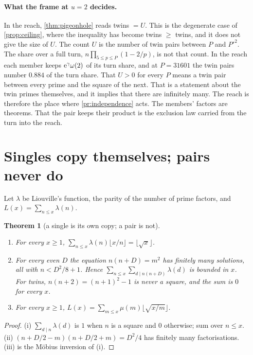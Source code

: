 \documentclass[11pt]{article}
\newtheorem{theorem}{Theorem}[section]
\theoremstyle{definition}\newtheorem{definition}[theorem]{Definition}
\theoremstyle{remark}\newtheorem{remark}[theorem]{Remark}
\begin{document}
\paragraph{What the frame at $u=2$ decides.} In the reach, \cref{thm:pigeonhole} reads twins $=U$. This is the degenerate case of \cref{prop:ceiling}, where the inequality has become twins $\ge$ twins, and it does not give the size of $U$. The count $U$ is the number of twin pairs between $P$ and $P'^2$. The share over a full turn, $n\prod_{5\le p\le P}(1-2/p)$, is not that count. In the reach each member keeps $\mathrm e^\gamma\omega(2)$ of its turn share, and at $P=31601$ the twin pairs number $0.884$ of the turn share. That $U>0$ for every $P$ means a twin pair between every prime and the square of the next. That is a statement about the twin primes themselves, and it implies that there are infinitely many. The reach is therefore the place where \cref{pr:independence} acts. The members' factors are theorems. That the pair keeps their product is the exclusion law carried from the turn into the reach.

\section{Singles copy themselves; pairs never do}\label{sec:self-copy}

Let $\lambda$ be Liouville's function, the parity of the number of prime factors, and $L(x)=\sum_{n\le x}\lambda(n)$.

\begin{theorem}[a single is its own copy; a pair is not]\label{thm:copy}
\begin{enumerate}[label=\textup{(\roman*)}]
\item For every $x\ge1$, $\sum_{n\le x}\lambda(n)\lfloor x/n\rfloor=\lfloor\sqrt x\rfloor$.
\item For every even $D$ the equation $n(n+D)=m^2$ has finitely many solutions, all with $n<D^2/8+1$. Hence $\sum_{n\le x}\sum_{d\mid n(n+D)}\lambda(d)$ is bounded in $x$. For twins, $n(n+2)=(n+1)^2-1$ is never a square, and the sum is $0$ for every $x$.
\item For every $x\ge1$, $L(x)=\sum_{m\le x}\mu(m)\lfloor\sqrt{x/m}\rfloor$.
\end{enumerate}
\end{theorem}
\begin{proof}
(i) $\sum_{d\mid n}\lambda(d)$ is $1$ when $n$ is a square and $0$ otherwise; sum over $n\le x$. (ii) $(n+D/2-m)(n+D/2+m)=D^2/4$ has finitely many factorisations. (iii) is the Möbius inversion of (i).
\end{proof}
\end{document}
